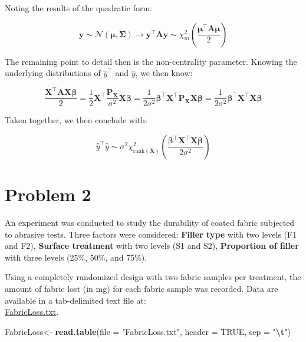 \documentclass[
]{article}
\newenvironment{Shaded}{\begin{snugshade}}{\end{snugshade}}
\newcommand{\AttributeTok}[1]{\textcolor[rgb]{0.13,0.29,0.53}{#1}}
\newcommand{\ConstantTok}[1]{\textcolor[rgb]{0.56,0.35,0.01}{#1}}
\newcommand{\FunctionTok}[1]{\textcolor[rgb]{0.13,0.29,0.53}{\textbf{#1}}}
\newcommand{\NormalTok}[1]{#1}
\newcommand{\OtherTok}[1]{\textcolor[rgb]{0.56,0.35,0.01}{#1}}
\newcommand{\SpecialCharTok}[1]{\textcolor[rgb]{0.81,0.36,0.00}{\textbf{#1}}}
\newcommand{\StringTok}[1]{\textcolor[rgb]{0.31,0.60,0.02}{#1}}
\begin{document}
Noting the results of the quadratic form:

\[
\mathbf{y} \sim \mathcal{N}(\boldsymbol{\mu}, \boldsymbol{\Sigma})
\rightarrow
\mathbf{y}^{\top} \boldsymbol{A} \mathbf{y} \sim \chi^2_m \left( \frac{\boldsymbol{\mu}^{\top} \boldsymbol{A} \boldsymbol{\mu}}{2} \right)
\]

The remaining point to detail then is the non-centrality parameter.
Knowing the underlying distributions of \(\hat{y}^{\top}\) and
\(\hat{y}\), we then know:

\[
\frac{\boldsymbol{X}^{\top} \boldsymbol{A} \boldsymbol{X} \boldsymbol{\beta}}{2} = \frac{1}{2}\boldsymbol{X}^{\top} \frac{\boldsymbol{P_X}}{\sigma^2} \boldsymbol{X} \boldsymbol{\beta}
= \frac{1}{2 \sigma^2} \boldsymbol{\beta}^{\top} \boldsymbol{X}^{\top} \boldsymbol{P_X} \boldsymbol{X} \boldsymbol{\beta}
= \frac{1}{2 \sigma^2} \boldsymbol{\beta}^{\top} \boldsymbol{X}^{\top} \boldsymbol{X} \boldsymbol{\beta}
\]

Taken together, we then conclude with:

\[
\hat{y}^{\top} \hat{y} \sim \sigma^2 \chi^2_{\text{rank}(\boldsymbol{X})} \left( \frac{\boldsymbol{\beta}^{\top} \boldsymbol{X}^{\top} \boldsymbol{X} \boldsymbol{\beta}}{2\sigma^2} \right)
\]

\newpage

\section{Problem 2}\label{problem-2}

An experiment was conducted to study the durability of coated fabric
subjected to abrasive tests. Three factors were considered:
\textbf{Filler type} with two levels (F1 and F2), \textbf{Surface
treatment} with two levels (S1 and S2), \textbf{Proportion of filler}
with three levels (25\%, 50\%, and 75\%).

Using a completely randomized design with two fabric samples per
treatment, the amount of fabric lost (in mg) for each fabric sample was
recorded. Data are available in a tab-delimited text file at:\\
\href{http://dnett.github.io/S510/FabricLoss.txt}{FabricLoss.txt}.

\begin{Shaded}
\begin{Highlighting}[]
\NormalTok{FabricLoss}\OtherTok{\textless{}{-}} \FunctionTok{read.table}\NormalTok{(}\AttributeTok{file =} \StringTok{"FabricLoss.txt"}\NormalTok{, }
                     \AttributeTok{header =} \ConstantTok{TRUE}\NormalTok{, }
                     \AttributeTok{sep =} \StringTok{"}\SpecialCharTok{\textbackslash{}t}\StringTok{"}\NormalTok{)}
\end{Highlighting}
\end{Shaded}
\end{document}
